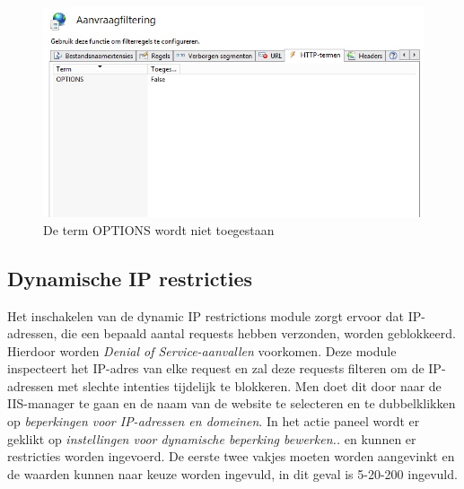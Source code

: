 \documentclass[pdftex,a4paper,12pt]{report}
\begin{document}
\begin{figure}[H]
\begin{center}
\includegraphics[scale=0.60]{img/IIS_Options}
\end{center}
\caption{De term OPTIONS wordt niet toegestaan}
\label{img:IISOptions}
\end{figure}

\subsection{Dynamische IP restricties}
Het inschakelen van de dynamic IP restrictions module zorgt ervoor dat IP-adressen, die een bepaald aantal requests hebben verzonden, worden geblokkeerd. Hierdoor worden \textit{Denial of Service-aanvallen} voorkomen. Deze module inspecteert het IP-adres van elke request en zal deze requests filteren om de IP-adressen met slechte intenties tijdelijk te blokkeren. Men doet dit door naar de IIS-manager te gaan en de naam van de website te selecteren en te dubbelklikken op \textit{beperkingen voor IP-adressen en domeinen}. In het actie paneel wordt er geklikt op \textit{instellingen voor dynamische beperking bewerken.. }en kunnen er restricties worden ingevoerd. De eerste twee vakjes moeten worden aangevinkt en de waarden kunnen naar keuze worden ingevuld, in dit geval is 5-20-200 ingevuld. \citep{Darmanin2014}
\end{document}
